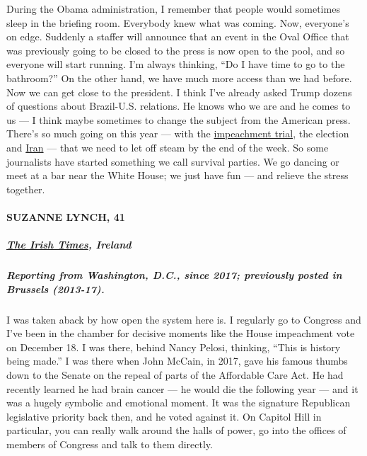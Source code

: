 During the Obama administration, I remember that people would sometimes
sleep in the briefing room. Everybody knew what was coming. Now,
everyone's on edge. Suddenly a staffer will announce that an event in
the Oval Office that was previously going to be closed to the press is
now open to the pool, and so everyone will start running. I'm always
thinking, ``Do I have time to go to the bathroom?'' On the other hand,
we have much more access than we had before. Now we can get close to the
president. I think I've already asked Trump dozens of questions about
Brazil-U.S. relations. He knows who we are and he comes to us --- I
think maybe sometimes to change the subject from the American press.
There's so much going on this year --- with the
\href{https://www.nytimes3xbfgragh.onion/2020/02/05/us/politics/impeachment-vote.html}{impeachment
trial}, the election and
\href{https://www.nytimes3xbfgragh.onion/2020/01/05/world/middleeast/Iran-us-trump.html}{Iran}
--- that we need to let off steam by the end of the week. So some
journalists have started something we call survival parties. We go
dancing or meet at a bar near the White House; we just have fun --- and
relieve the stress together.

\hypertarget{suzanne-lynch-41}{%
\paragraph{SUZANNE LYNCH, 41}\label{suzanne-lynch-41}}

\hypertarget{the-irish-times-ireland}{%
\subparagraph{\texorpdfstring{\textbf{\href{https://www.irishtimes.com/}{The
Irish Times},
Ireland}}{The Irish Times, Ireland}}\label{the-irish-times-ireland}}

\hypertarget{reporting-from-washington-dc-since-2017-previously-posted-in-brussels-2013-17}{%
\subparagraph{\texorpdfstring{\textbf{Reporting from Washington, D.C.,
since 2017; previously posted in Brussels
(2013-17).}}{Reporting from Washington, D.C., since 2017; previously posted in Brussels (2013-17).}}\label{reporting-from-washington-dc-since-2017-previously-posted-in-brussels-2013-17}}

I was taken aback by how open the system here is. I regularly go to
Congress and I've been in the chamber for decisive moments like the
House impeachment vote on December 18. I was there, behind Nancy Pelosi,
thinking, ``This is history being made.'' I was there when John McCain,
in 2017, gave his famous thumbs down to the Senate on the repeal of
parts of the Affordable Care Act. He had recently learned he had brain
cancer --- he would die the following year --- and it was a hugely
symbolic and emotional moment. It was the signature Republican
legislative priority back then, and he voted against it. On Capitol Hill
in particular, you can really walk around the halls of power, go into
the offices of members of Congress and talk to them directly.

